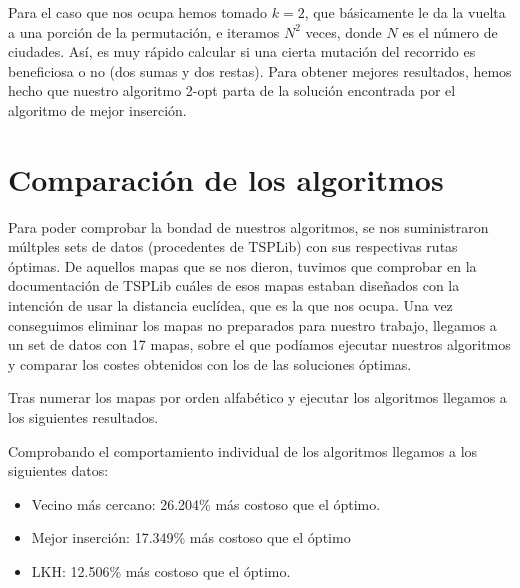 \documentclass[a4paper, 11pt]{article}
\begin{document}
Para el caso que nos ocupa hemos tomado $k=2$, que básicamente le da la vuelta a una porción de la permutación, e iteramos $N^2$ veces, donde $N$ es el número de ciudades. Así, es muy rápido calcular si una cierta mutación del recorrido es beneficiosa o no (dos sumas y dos restas). Para obtener mejores resultados, hemos hecho que nuestro algoritmo 2-opt parta de la solución encontrada por el algoritmo de mejor inserción.

\section{Comparación de los algoritmos}
Para poder comprobar la bondad de nuestros algoritmos, se nos suministraron múltples sets de datos (procedentes de TSPLib) con sus respectivas rutas óptimas. De aquellos mapas que se nos dieron, tuvimos que comprobar en la documentación de TSPLib cuáles de esos mapas estaban diseñados con la intención de usar la distancia euclídea, que es la que nos ocupa. Una vez conseguimos eliminar los mapas no preparados para nuestro trabajo, llegamos a un set de datos con 17 mapas, sobre el que podíamos ejecutar nuestros algoritmos y comparar los costes obtenidos con los de las soluciones óptimas.

Tras numerar los mapas por orden alfabético y ejecutar los algoritmos llegamos a los siguientes resultados.




Comprobando el comportamiento individual de los algoritmos llegamos a los siguientes datos:
\begin{itemize}
	\item Vecino más cercano: 26.204\% más costoso que el óptimo.
	\item Mejor inserción: 17.349\% más costoso que el óptimo
	\item LKH: 12.506\% más costoso que el óptimo.
\end{itemize}
\end{document}
